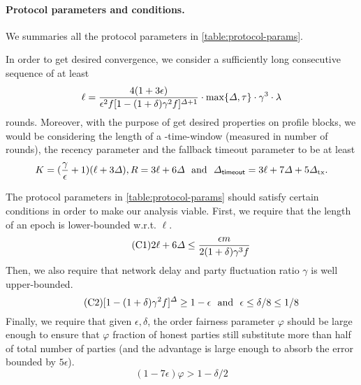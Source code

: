 \paragraph{Protocol parameters and conditions.}
%
We summaries all the protocol parameters in \cref{table:protocol-params}.



In order to get desired convergence, we consider a sufficiently long consecutive sequence of at least
%
\begin{equation} \label{eq:ell-length}
    \ell = \frac{4(1 + 3\epsilon)}{\epsilon^2 f [1 - (1 + \delta) \gamma^2 f]^{\varDelta + 1}} \cdot \max \{\varDelta, \tau\} \cdot \gamma^3 \cdot \lambda
\end{equation}
%
rounds.
%
Moreover, with the purpose of get desired properties on profile blocks, we would be considering the length of a \PBWindowLen-time-window (measured in number of rounds), the recency parameter and the fallback timeout parameter to be at least
%
\begin{equation} \label{eq:window-length}
    K = (\frac{\gamma}{\epsilon} + 1) (\ell + 3\varDelta), R = 3\ell + 6\varDelta  ~~\text{and}~~ \varDelta_{\mathsf{timeout}} = 3\ell + 7\varDelta + 5\varDelta_{\mathrm{tx}}.
\end{equation}

The protocol parameters in \cref{table:protocol-params} should satisfy certain conditions in order to make our analysis viable.
%
First, we require that the length of an epoch is lower-bounded w.r.t. $\ell$.
%
\begin{equation} \label{condition:min-length} \tag{C1}
    2\ell + 6\varDelta \le \frac{\epsilon m}{2(1 + \delta)\gamma^3 f}
\end{equation}
%
Then, we also require that network delay \delay and party fluctuation ratio $\gamma$ is well upper-bounded.
%
\begin{equation} \label{condition:error-absorb} \tag{C2}
    [1 - (1 + \delta)\gamma^2 f]^\varDelta \ge 1 - \epsilon ~~\text{and}~~ \epsilon \le \delta / 8 \le 1 / 8
\end{equation}
%
Finally, we require that given $\epsilon, \delta$, the order fairness parameter $\varphi$ should be large enough to ensure that $\varphi$ fraction of honest parties still substitute more than half of total number of parties (and the advantage is large enough to absorb the error bounded by $5\epsilon$).
%
\begin{equation} \label{condition:order-fairness-param} \tag{C3}
    (1 - 7\epsilon) \varphi > 1 - \delta / 2
\end{equation}

